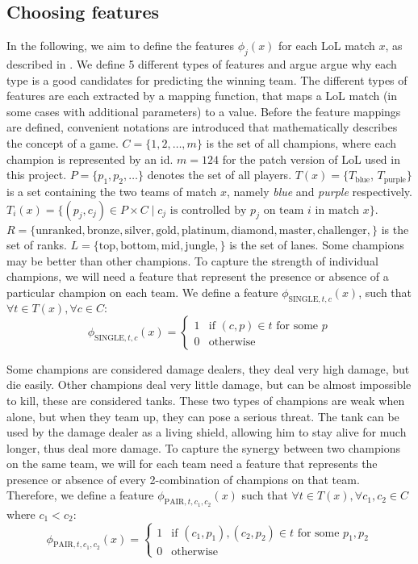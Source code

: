 \subsection{Choosing features}\label{sec:choosingfeatures}
In the following, we aim to define the features $\phi_j(x)$ for each LoL match $x$, as described in .
We define 5 different types of features and argue argue why each type is a good candidates for predicting the winning team.
The different types of features are each extracted by a mapping function, that maps a LoL match (in some cases with additional parameters) to a value. 
Before the feature mappings are defined, convenient notations are introduced that mathematically describes the concept of a game.
$C = \{1, 2, \dots, m\}$ is the set of all champions, where each champion is represented by an id. $m = 124$ for the patch version of LoL used in this project.
$P = \{p_1, p_2, \dots\}$ denotes the set of all players.
$T(x) = \{T_\text{blue}$, $T_\text{purple}\}$ is a set containing the two teams of match $x$, namely \emph{blue} and \emph{purple} respectively.
$T_i(x) = \{ (p_j, c_j) \in P \times C \mid c_j \text{ is controlled by } p_j \text{ on team } i  \text{ in match } x \}$.
$R = \{\text{unranked},\text{bronze},\text{silver},\text{gold},\text{platinum},\text{diamond},\text{master},\text{challenger},\}$ is the set of ranks.
$L = \{\text{top},\text{bottom},\text{mid},\text{jungle},\}$ is the set of lanes.
Some champions may be better than other champions. To capture the strength of individual champions, we will need a feature that represent the presence or absence of a particular champion on each team.
We define a feature $\phi_{\text{SINGLE}, t, c}(x)$, such that $\forall t \in T(x), \forall c \in C:$
\[
\phi_{\text{SINGLE}, t, c}(x) = 
\begin{cases} 
  1 & \text{if } (c, p) \in t \text{ for some } p \\
  0 & \text{otherwise} 
\end{cases}
\]

Some champions are considered damage dealers, they deal very high damage, but die easily. Other champions deal very little damage, but can be almost impossible to kill, these are considered tanks. These two types of champions are weak when alone, but when they team up, they can pose a serious threat. The tank can be used by the damage dealer as a living shield, allowing him to stay alive for much longer, thus deal more damage.
To capture the synergy between two champions on the same team, we will for each team need a feature that represents the presence or absence of every 2-combination of champions on that team. Therefore, we define a feature $\phi_{\text{PAIR},t, c_1, c_2}(x)$ such that $\forall t \in T(x), \forall c_1, c_2 \in C$ where $c_1 < c_2$:
\[
\phi_{\text{PAIR}, t, c_1, c_2}(x) =
\begin{cases}
  1 & \text{if } (c_1, p_1), (c_2, p_2) \in t \text{ for some }p_1, p_2\\
  0 & \text{otherwise}
\end{cases}
\]

